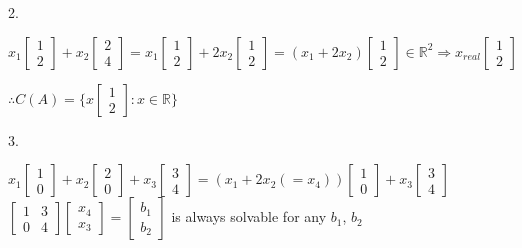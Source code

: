 \documentclass[12pt,a4paper]{article}
\begin{document}
2.

$
x_1
\begin{bmatrix}
  1 \\
  2
\end{bmatrix} + 
x_2
\begin{bmatrix}
  2 \\
  4
\end{bmatrix} = 
x_1
\begin{bmatrix}
  1 \\
  2
\end{bmatrix} + 
2x_2
\begin{bmatrix}
  1 \\
  2
\end{bmatrix} =
(x_1 + 2x_2)
\begin{bmatrix}
  1 \\
  2
\end{bmatrix} \in \mathbb{R}^2 \Rightarrow
x_{real}
\begin{bmatrix}
  1 \\
  2
\end{bmatrix}
$

$\therefore C(A) =
\{
  x
  \begin{bmatrix}
    1 \\
    2
  \end{bmatrix}
  : x \in \mathbb{R}
\}
$

3.

$
x_1
\begin{bmatrix}
  1 \\
  0
\end{bmatrix} +
x_2
\begin{bmatrix}
  2 \\
  0
\end{bmatrix} +
x_3
\begin{bmatrix}
  3 \\
  4
\end{bmatrix} =
(x_1 + 2x_2 (= x_4))
\begin{bmatrix}
  1 \\
  0
\end{bmatrix} +
x_3
\begin{bmatrix}
  3 \\
  4
\end{bmatrix} 
$
$
  \begin{bmatrix}
    1 & 3 \\
    0 & 4
  \end{bmatrix}
  \begin{bmatrix}
    x_4 \\
    x_3
  \end{bmatrix} = 
  \begin{bmatrix}
    b_1 \\
    b_2
  \end{bmatrix}
$ is always solvable for any $b_1$, $b_2$
\end{document}
